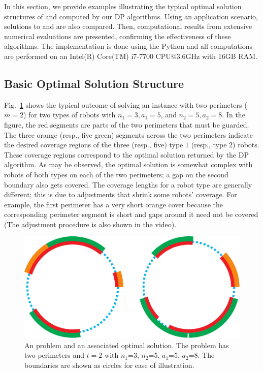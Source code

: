 In this section, we provide examples illustrating the typical 
optimal solution structures of \opglr and \opgmc computed by 
our DP algorithms. Using an application scenario, solutions to 
\opglr and \opgmc are also compared. Then, computational 
results from extensive numerical evaluations are presented, 
confirming the effectiveness of these algorithms. The 
implementation is done using the Python and all 
computations are performed on an Intel(R) Core(TM) i7-7700 CPU@3.6GHz 
with 16GB RAM. 

\subsection{Basic Optimal Solution Structure}
Fig.~\ref{fig:opglrm} shows the typical outcome of solving an \opglr 
instance with two perimeters ($m = 2$) for two types of robots with 
$n_1 = 3, a_1 = 5$, and $n_2 = 5, a_2 = 8$. 
In the figure, the red segments are parts of the two perimeters that 
must be guarded. The three orange (resp., five green) segments across 
the two perimeters indicate the desired coverage regions of the three 
(resp., five) type $1$ (resp., type $2$) robots. These coverage regions 
correspond to the optimal solution returned by the DP algorithm. As 
may be observed, the optimal solution is somewhat complex with robots 
of both types on each of the two perimeters; a gap on the second boundary 
also gets covered. The coverage lengths for a robot type are generally 
different; this is due to adjustments that shrink some robots' coverage. 
For example, the first perimeter has a very short orange cover because 
the corresponding perimeter segment is short and gaps around it need 
not be covered (The adjustment procedure is also shown in the video). 
\begin{figure}[!ht]
    \centering
    \includegraphics[scale = 0.6]{chapters/opg-ext/figures/mopglr_shrink-new-eps-converted-to.pdf}
    \caption{An \opglr problem and an associated optimal solution. The 
		problem has two perimeters and $t = 2$ with $n_1$=3, $n_2$=5, 
		$a_1$=5, $a_2$=8. The boundaries are shown as circles for ease of 
		illustration.
		}
		\label{fig:opglrm}
\end{figure}

